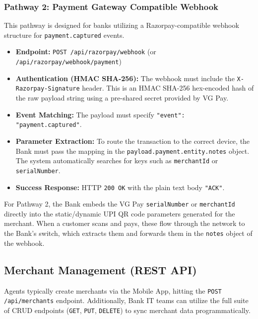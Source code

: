 \documentclass[11pt,a4paper]{article}
\begin{document}
\subsubsection{Pathway 2: Payment Gateway Compatible Webhook}
This pathway is designed for banks utilizing a Razorpay-compatible webhook structure for \texttt{payment.captured} events.
\begin{itemize}
    \item \textbf{Endpoint:} \texttt{POST /api/razorpay/webhook} (or \texttt{/api/razorpay/webhook/payment})
    \item \textbf{Authentication (HMAC SHA-256):} The webhook must include the \texttt{X-Razorpay\allowbreak-Signature} header. This is an HMAC SHA-256 hex-encoded hash of the raw payload string using a pre-shared secret provided by VG Pay.
    \item \textbf{Event Matching:} The payload must specify \texttt{"event": "payment.captured"}.
    \item \textbf{Parameter Extraction:} To route the transaction to the correct device, the Bank must pass the mapping in the \texttt{payload.payment.entity.notes} object. The system automatically searches for keys such as \texttt{merchantId} or \texttt{serialNumber}.
    \item \textbf{Success Response:} HTTP \texttt{200 OK} with the plain text body \texttt{"ACK"}.
\end{itemize}

\begin{tcolorbox}[colback=blue!5!white,colframe=blue!75!black,title=How does the Bank get the Device or Merchant ID?]
For Pathway 2, the Bank embeds the VG Pay \texttt{serialNumber} or \texttt{merchantId} directly into the static/dynamic UPI QR code parameters generated for the merchant. When a customer scans and pays, these flow through the network to the Bank's switch, which extracts them and forwards them in the \texttt{notes} object of the webhook.
\end{tcolorbox}

\subsection{Merchant Management (REST API)}

Agents typically create merchants via the Mobile App, hitting the \texttt{POST /api/merchants} endpoint. Additionally, Bank IT teams can utilize the full suite of CRUD endpoints (\texttt{GET}, \texttt{PUT}, \texttt{DELETE}) to sync merchant data programmatically.
\end{document}
